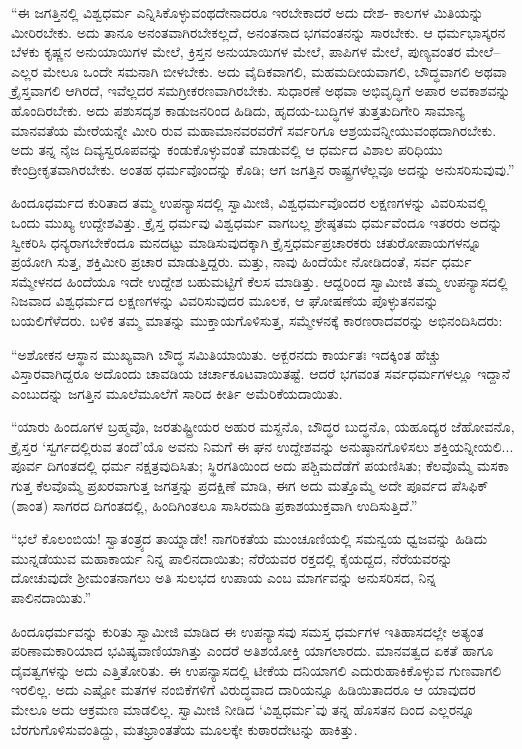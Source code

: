 “ಈ ಜಗತ್ತಿನಲ್ಲಿ ವಿಶ್ವಧರ್ಮ ಎನ್ನಿಸಿಕೊಳ್ಳುವಂಥದೇನಾದರೂ ಇರಬೇಕಾದರೆ ಅದು ದೇಶ- ಕಾಲಗಳ ಮಿತಿಯನ್ನು ಮೀರಿರಬೇಕು. ಅದು ತಾನೂ ಅನಂತವಾಗಿರಬೇಕಲ್ಲದೆ, ಅನಂತನಾದ ಭಗವಂತನನ್ನು ಸಾರಬೇಕು. ಆ ಧರ್ಮಭಾಸ್ಕರನ ಬೆಳಕು ಕೃಷ್ಣನ ಅನುಯಾಯಿಗಳ ಮೇಲೆ, ಕ್ರಿಸ್ತನ ಅನುಯಾಯಿಗಳ ಮೇಲೆ, ಪಾಪಿಗಳ ಮೇಲೆ, ಪುಣ್ಯವಂತರ ಮೇಲೆ–ಎಲ್ಲರ ಮೇಲೂ ಒಂದೇ ಸಮನಾಗಿ ಬೀಳಬೇಕು. ಅದು ವೈದಿಕವಾಗಲಿ, ಮಹಮದೀಯವಾಗಲಿ, ಬೌದ್ಧವಾಗಲಿ ಅಥವಾ ಕ್ರೈಸ್ತವಾಗಲಿ ಆಗಿರದೆ, ಇವೆಲ್ಲದರ ಸಮಗ್ರೀಕರಣವಾಗಿರಬೇಕು. ಸುಧಾರಣೆ ಅಥವಾ ಅಭಿವೃದ್ಧಿಗೆ ಅಪಾರ ಅವಕಾಶವನ್ನು ಹೊಂದಿರಬೇಕು. ಅದು ಪಶುಸದೃಶ ಕಾಡುಜನರಿಂದ ಹಿಡಿದು, ಹೃದಯ-ಬುದ್ಧಿಗಳ ತುತ್ತತುದಿಗೇರಿ ಸಾಮಾನ್ಯ ಮಾನವತೆಯ ಮೇರೆಯನ್ನೇ ಮೀರಿ ರುವ ಮಹಾಮಾನವರವರೆಗೆ ಸರ್ವರಿಗೂ ಆಶ್ರಯವನ್ನೀಯುವಂಥದಾಗಿರಬೇಕು. ಅದು ತನ್ನ ನೈಜ ದಿವ್ಯಸ್ವರೂಪವನ್ನು ಕಂಡುಕೊಳ್ಳುವಂತೆ ಮಾಡುವಲ್ಲಿ ಆ ಧರ್ಮದ ವಿಶಾಲ ಪರಿಧಿಯು ಕೇಂದ್ರೀಕೃತವಾಗಿರಬೇಕು. ಅಂತಹ ಧರ್ಮವೊಂದನ್ನು ಕೊಡಿ; ಆಗ ಜಗತ್ತಿನ ರಾಷ್ಟ್ರಗಳೆಲ್ಲವೂ ಅದನ್ನು ಅನುಸರಿಸುವುವು.”

ಹಿಂದೂಧರ್ಮದ ಕುರಿತಾದ ತಮ್ಮ ಉಪನ್ಯಾಸದಲ್ಲಿ ಸ್ವಾಮೀಜಿ, ವಿಶ್ವಧರ್ಮವೊಂದರ ಲಕ್ಷಣಗಳನ್ನು ವಿವರಿಸುವಲ್ಲಿ ಒಂದು ಮುಖ್ಯ ಉದ್ದೇಶವಿತ್ತು. ಕ್ರೈಸ್ತ ಧರ್ಮವು ವಿಶ್ವಧರ್ಮ ವಾಗಬಲ್ಲ ಶ್ರೇಷ್ಠತಮ ಧರ್ಮವೆಂದೂ ಇತರರು ಅದನ್ನು ಸ್ವೀಕರಿಸಿ ಧನ್ಯರಾಗಬೇಕೆಂದೂ ಮನದಟ್ಟು ಮಾಡಿಸುವುದಕ್ಕಾಗಿ ಕ್ರೈಸ್ತಧರ್ಮಪ್ರಚಾರಕರು ಚತುರೋಪಾಯಗಳನ್ನೂ ಪ್ರಯೋಗಿ ಸುತ್ತ, ಶಕ್ತಿಮೀರಿ ಪ್ರಚಾರ ಮಾಡುತ್ತಿದ್ದರು. ಮತ್ತು, ನಾವು ಹಿಂದೆಯೇ ನೋಡಿದಂತೆ, ಸರ್ವ ಧರ್ಮ ಸಮ್ಮೇಳನದ ಹಿಂದೆಯೂ ಇದೇ ಉದ್ದೇಶ ಬಹುಮಟ್ಟಿಗೆ ಕೆಲಸ ಮಾಡಿತ್ತು. ಆದ್ದರಿಂದ ಸ್ವಾಮೀಜಿ ತಮ್ಮ ಉಪನ್ಯಾಸದಲ್ಲಿ ನಿಜವಾದ ವಿಶ್ವಧರ್ಮದ ಲಕ್ಷಣಗಳನ್ನು ವಿವರಿಸುವುದರ ಮೂಲಕ, ಆ ಘೋಷಣೆಯ ಪೊಳ್ಳುತನವನ್ನು ಬಯಲಿಗೆಳೆದರು. ಬಳಿಕ ತಮ್ಮ ಮಾತನ್ನು ಮುಕ್ತಾಯಗೊಳಿಸುತ್ತ, ಸಮ್ಮೇಳನಕ್ಕೆ ಕಾರಣರಾದವರನ್ನು ಅಭಿನಂದಿಸಿದರು:

“ಅಶೋಕನ ಆಸ್ಥಾನ ಮುಖ್ಯವಾಗಿ ಬೌದ್ಧ ಸಮಿತಿಯಾಯಿತು. ಅಕ್ಬರನದು ಕಾರ್ಯತಃ ಇದಕ್ಕಿಂತ ಹೆಚ್ಚು ವಿಸ್ತಾರವಾಗಿದ್ದರೂ ಅದೊಂದು ಚಾವಡಿಯ ಚರ್ಚಾಕೂಟವಾಯಿತಷ್ಟೆ. ಆದರೆ ಭಗವಂತ ಸರ್ವಧರ್ಮಗಳಲ್ಲೂ ಇದ್ದಾನೆ ಎಂಬುದನ್ನು ಜಗತ್ತಿನ ಮೂಲೆಮೂಲೆಗೆ ಸಾರಿದ ಕೀರ್ತಿ ಅಮೆರಿಕೆಯದಾಯಿತು.

“ಯಾರು ಹಿಂದೂಗಳ ಬ್ರಹ್ಮವೊ, ಜರತುಷ್ಟ್ರೀಯರ ಅಹುರ ಮಸ್ದನೊ, ಬೌದ್ಧರ ಬುದ್ಧನೊ, ಯಹೂದ್ಯರ ಜೆಹೋವನೊ, ಕ್ರೈಸ್ತರ ‘ಸ್ವರ್ಗದಲ್ಲಿರುವ ತಂದೆ’ಯೊ ಅವನು ನಿಮಗೆ ಈ ಘನ ಉದ್ದೇಶವನ್ನು ಅನುಷ್ಠಾನಗೊಳಿಸಲು ಶಕ್ತಿಯನ್ನೀಯಲಿ... ಪೂರ್ವ ದಿಗಂತದಲ್ಲಿ ಧರ್ಮ ನಕ್ಷತ್ರವುದಿಸಿತು; ಸ್ಥಿರಗತಿಯಿಂದ ಅದು ಪಶ್ಚಿಮದೆಡೆಗೆ ಪಯಣಿಸಿತು; ಕೆಲವೊಮ್ಮೆ ಮಸಕಾ ಗುತ್ತ ಕೆಲವೊಮ್ಮೆ ಪ್ರಖರವಾಗುತ್ತ ಜಗತ್ತನ್ನು ಪ್ರದಕ್ಷಿಣೆ ಮಾಡಿ, ಈಗ ಅದು ಮತ್ತೊಮ್ಮೆ ಅದೇ ಪೂರ್ವದ ಪೆಸಿಫಿಕ್ (ಶಾಂತ) ಸಾಗರದ ದಿಗಂತದಲ್ಲಿ, ಹಿಂದಿಗಿಂತಲೂ ಸಾಸಿರಮಡಿ ಪ್ರಕಾಶಯುಕ್ತವಾಗಿ ಉದಿಸುತ್ತಿದೆ.”

“ಭಲೆ ಕೊಲಂಬಿಯ! ಸ್ವಾತಂತ್ರ್ಯದ ತಾಯ್ನಾಡೇ! ನಾಗರಿಕತೆಯ ಮುಂಚೂಣಿಯಲ್ಲಿ ಸಮನ್ವಯ ಧ್ವಜವನ್ನು ಹಿಡಿದು ಮುನ್ನಡೆಯುವ ಮಹಾಕಾರ್ಯ ನಿನ್ನ ಪಾಲಿನದಾಯಿತು; ನೆರೆಯವರ ರಕ್ತದಲ್ಲಿ ಕೈಯದ್ದದ, ನೆರೆಯವರನ್ನು ದೋಚುವುದೇ ಶ್ರೀಮಂತನಾಗಲು ಅತಿ ಸುಲಭದ ಉಪಾಯ ಎಂಬ ಮಾರ್ಗವನ್ನು ಅನುಸರಿಸದ, ನಿನ್ನ ಪಾಲಿನದಾಯಿತು.”

ಹಿಂದೂಧರ್ಮವನ್ನು ಕುರಿತು ಸ್ವಾಮೀಜಿ ಮಾಡಿದ ಈ ಉಪನ್ಯಾಸವು ಸಮಸ್ತ ಧರ್ಮಗಳ ಇತಿಹಾಸದಲ್ಲೇ ಅತ್ಯಂತ ಪರಿಣಾಮಕಾರಿಯಾದ ಭವಿಷ್ಯವಾಣಿಯಾಗಿತ್ತು ಎಂದರೆ ಅತಿಶಯೋಕ್ತಿ ಯಾಗಲಾರದು. ಮಾನವತ್ವದ ಏಕತೆ ಹಾಗೂ ದೈವತ್ವಗಳನ್ನು ಅದು ಎತ್ತಿತೋರಿತು. ಈ ಉಪನ್ಯಾಸದಲ್ಲಿ ಟೀಕೆಯ ದನಿಯಾಗಲಿ ಎದುರುಹಾಕಿಕೊಳ್ಳುವ ಗುಣವಾಗಲಿ ಇರಲಿಲ್ಲ. ಅದು ಎಷ್ಟೋ ಮತಗಳ ನಂಬಿಕೆಗಳಿಗೆ ವಿರುದ್ಧವಾದ ದಾರಿಯನ್ನೂ ಹಿಡಿಯಿತಾದರೂ ಆ ಯಾವುದರ ಮೇಲೂ ಅದು ಆಕ್ರಮಣ ಮಾಡಲಿಲ್ಲ. ಸ್ವಾಮೀಜಿ ನೀಡಿದ ‘ವಿಶ್ವಧರ್ಮ’ವು ತನ್ನ ಹೊಸತನ ದಿಂದ ಎಲ್ಲರನ್ನೂ ಬೆರಗುಗೊಳಿಸುವಂತಿದ್ದು, ಮತಭ್ರಾಂತತೆಯ ಮೂಲಕ್ಕೇ ಕುಠಾರದೇಟನ್ನು ಹಾಕಿತ್ತು.

